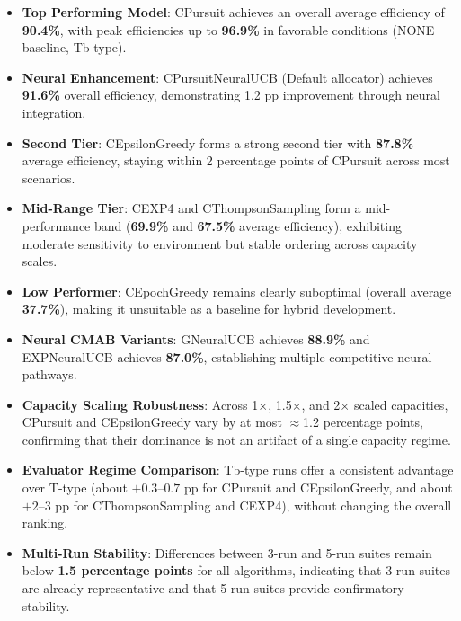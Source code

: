 \documentclass[12pt,a4paper]{article}
\newcommand{\performance}[1]{\textcolor{performancecolor}{\textbf{#1}}}
\newcommand{\critical}[1]{\textcolor{criticalcolor}{\textbf{#1}}}
\newcommand{\success}[1]{\textcolor{successcolor}{\textbf{#1}}}
\newcommand{\neural}[1]{\textcolor{neuralcolor}{\textbf{#1}}}
\begin{document}
\begin{tcolorbox}[colback=highlightcolor!30,colframe=performancecolor,title=\textbf{Key Experimental Results Summary (3-run/5-run, 1$\times$–2$\times$ Capacities, T/Tb Regimes)}]
\begin{itemize}
\item \performance{Top Performing Model}: CPursuit achieves an overall average efficiency of \textbf{90.4\%}, with peak efficiencies up to \textbf{96.9\%} in favorable conditions (NONE baseline, Tb-type).
\item \neural{Neural Enhancement}: CPursuitNeuralUCB (Default allocator) achieves \textbf{91.6\%} overall efficiency, demonstrating 1.2 pp improvement through neural integration.
\item \performance{Second Tier}: CEpsilonGreedy forms a strong second tier with \textbf{87.8\%} average efficiency, staying within 2 percentage points of CPursuit across most scenarios.
\item \performance{Mid-Range Tier}: CEXP4 and CThompsonSampling form a mid-performance band (\textbf{69.9\%} and \textbf{67.5\%} average efficiency), exhibiting moderate sensitivity to environment but stable ordering across capacity scales.
\item \critical{Low Performer}: CEpochGreedy remains clearly suboptimal (overall average \textbf{37.7\%}), making it unsuitable as a baseline for hybrid development.
\item \neural{Neural CMAB Variants}: GNeuralUCB achieves \textbf{88.9\%} and EXPNeuralUCB achieves \textbf{87.0\%}, establishing multiple competitive neural pathways.
\item \success{Capacity Scaling Robustness}: Across 1$\times$, 1.5$\times$, and 2$\times$ scaled capacities, CPursuit and CEpsilonGreedy vary by at most $\approx$1.2 percentage points, confirming that their dominance is not an artifact of a single capacity regime.
\item \success{Evaluator Regime Comparison}: Tb-type runs offer a consistent advantage over T-type (about $+0.3$–$0.7$ pp for CPursuit and CEpsilonGreedy, and about $+2$–$3$ pp for CThompsonSampling and CEXP4), without changing the overall ranking.
\item \success{Multi-Run Stability}: Differences between 3-run and 5-run suites remain below \textbf{1.5 percentage points} for all algorithms, indicating that 3-run suites are already representative and that 5-run suites provide confirmatory stability.
\end{itemize}
\end{tcolorbox}
\end{document}
